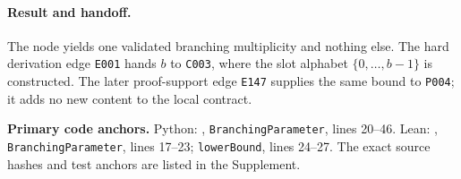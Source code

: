 \paragraph*{Result and handoff.}
The node yields one validated branching multiplicity and nothing else.  The
hard derivation edge \texttt{E001} hands $b$ to \texttt{C003}, where the slot
alphabet $\{0,\ldots,b-1\}$ is constructed.  The later proof-support edge
\texttt{E147} supplies the same bound to \texttt{P004}; it adds no new content
to the local contract.

\noindent\textbf{Primary code anchors.}
Python: ,
\texttt{BranchingParameter}, lines 20--46.  Lean:
,
\texttt{BranchingParameter}, lines 17--23; \texttt{lowerBound}, lines 24--27.
The exact source hashes and test anchors are listed in the Supplement.
